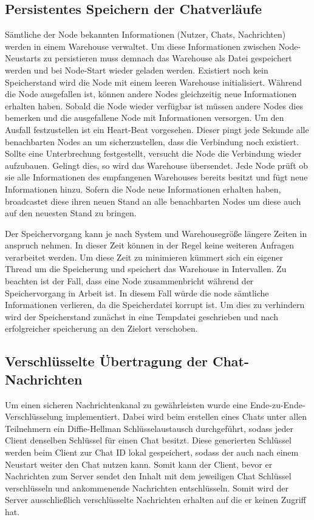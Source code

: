 \subsection{Persistentes Speichern der Chatverläufe}
Sämtliche der Node bekannten Informationen (Nutzer, Chats, Nachrichten) werden in einem Warehouse verwaltet. Um diese Informationen zwischen Node-Neustarts zu persistieren muss demnach das Warehouse als Datei gespeichert werden und bei Node-Start wieder geladen werden. Existiert noch kein Speicherstand wird die Node mit einem leeren Warehouse initialisiert. Während die Node ausgefallen ist, können andere Nodes gleichzeitig neue Informationen erhalten haben. Sobald die Node wieder verfügbar ist müssen andere Nodes dies bemerken und die ausgefallene Node mit Informationen versorgen. Um den Ausfall festzustellen ist ein Heart-Beat vorgesehen. Dieser pingt jede Sekunde alle benachbarten Nodes an um sicherzustellen, dass die Verbindung noch existiert. Sollte eine Unterbrechung festgestellt, versucht die Node die Verbindung wieder aufzubauen. Gelingt dies, so wird das Warehouse übersendet. Jede Node prüft ob sie alle Informationen des empfangenen Warehouses bereits besitzt und fügt neue Informationen hinzu. Sofern die Node neue Informationen erhalten haben, broadcastet diese ihren neuen Stand an alle benachbarten Nodes um diese auch auf den neuesten Stand zu bringen.

Der Speichervorgang kann je nach System und Warehousegröße längere Zeiten in anspruch nehmen. In dieser Zeit können in der Regel keine weiteren Anfragen verarbeitet werden. Um diese Zeit zu minimieren kümmert sich ein eigener Thread um die Speicherung und speichert das Warehouse in Intervallen.
Zu beachten ist der Fall, dass eine Node zusammenbricht während der Speichervorgang in Arbeit ist. In diesem Fall würde die node sämtliche Informationen verlieren, da die Speicherdatei korrupt ist. Um dies zu verhindern wird der Speicherstand zunächst in eine Tempdatei geschrieben und nach erfolgreicher speicherung an den Zielort verschoben.

\subsection{Verschlüsselte Übertragung der Chat-Nachrichten}
Um einen sicheren Nachrichtenkanal zu gewährleisten wurde eine 
Ende-zu-Ende-Verschlüsselung implementiert. Dabei wird beim
erstellen eines Chats unter allen Teilnehmern ein Diffie-Hellman 
Schlüsselaustausch durchgeführt, sodass jeder Client denselben 
Schlüssel für einen Chat besitzt. Diese generierten Schlüssel 
werden beim Client zur Chat ID lokal gespeichert, sodass der
auch nach einem Neustart weiter den Chat nutzen kann. Somit kann 
der Client, bevor er Nachrichten zum Server sendet den Inhalt mit dem 
jeweiligen Chat Schlüssel verschlüsseln und ankommenende 
Nachrichten entschlüsseln. Somit wird der Server ausschließlich
verschlüsselte Nachrichten erhalten auf die er keinen Zugriff hat.

